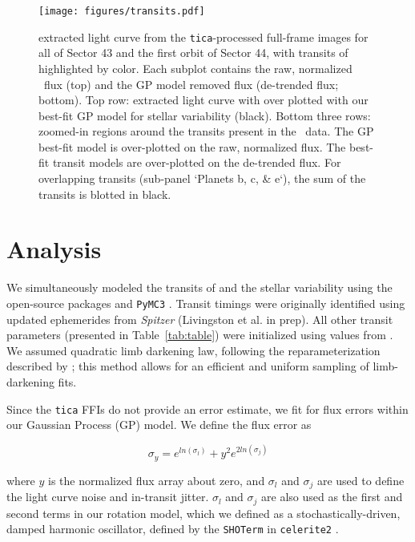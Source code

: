 \documentclass[twocolumn]{aastex631}
\begin{document}
\begin{figure}[hbtp]
\begin{center}
\texttt{[image: figures/transits.pdf]}
\caption{\sname extracted light curve from the \texttt{tica}-processed full-frame images for all of Sector 43 and the first orbit of Sector 44, with transits of \allplanets highlighted by color. Each subplot contains the raw, normalized \tess\ flux (top) and the GP model removed flux (de-trended flux; bottom). Top row: extracted light curve with over plotted with our best-fit GP model for stellar variability (black). Bottom three rows: zoomed-in regions around the transits present in the \tess\ data. The GP best-fit model is over-plotted on the raw, normalized flux. The best-fit transit models are over-plotted on the de-trended flux. For overlapping transits (sub-panel `Planets b, c, \& e`), the sum of the transits is blotted in black.} \label{fig:transits}
\end{center}
\end{figure}

\section{Analysis} \label{sec:analysis}

We simultaneously modeled the transits of \allplanets and the stellar variability using the open-source packages \exoplanet \citep{exoplanet2019, exoplanet2021} and \texttt{PyMC3} \citep{Salvatier16}. Transit timings were originally identified using updated ephemerides from \textit{Spitzer} (Livingston et al. in prep). All other transit parameters (presented in Table~\ref{tab:table}) were initialized using values from \cite{David2019a}. We assumed quadratic limb darkening law, following the reparameterization described by \cite{kipping13}; this method allows for an efficient and uniform sampling of limb-darkening fits.


Since the \texttt{tica} FFIs do not provide an error estimate, we fit for flux errors within our Gaussian Process (GP) model. We define the flux error as

\begin{equation}
    \sigma_y = e^{ln(\sigma_l)} + y^2 e^{2 ln(\sigma_j)}
\end{equation}

where $y$ is the normalized flux array about zero, and $\sigma_l$  and $\sigma_j$ are used to define the light curve noise and in-transit jitter. $\sigma_l$  and $\sigma_j$ are also used as the first and second terms in our rotation model, which we defined as a stochastically-driven, damped harmonic oscillator, defined by the \texttt{SHOTerm} in \texttt{celerite2} \citep{dfm17}.
\end{document}
